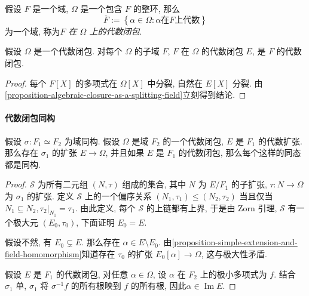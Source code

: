 \begin{proposition}
  假设 \( F \) 是一个域, \( \Omega \) 是一个包含 \( F \) 的整环, 那么
  \[
    \overline{F} := \left\lbrace \alpha \in \Omega: \alpha \text{在} F
    \text{上代数} \right\rbrace
  \]
  为一个域, 称为\emph{\( F \) 在 \( \Omega \) 上的代数闭包}.
\end{proposition}

\begin{corollary}
  假设 \( \Omega \) 是一个代数闭包.
  对每个 \( \Omega \) 的子域 \( F \), \( F \) 在 \( \Omega \) 的代数闭包 \( E
  \), 是 \( F \) 的代数闭包.
\end{corollary}
\begin{proof}
  每个 \( F[X] \) 的多项式在 \( \Omega[X] \) 中分裂, 自然在 \( E[X] \) 分裂.
  由\cref{proposition-algebraic-closure-as-a-splitting-field}立刻得到结论.
\end{proof}

\paragraph{代数闭包同构}

\begin{theorem}
  \label{theorem-algebraic-closure-isomorphic}
  假设 \( \sigma: F_1 \simeq F_2 \) 为域同构.
  假设 \( \Omega \) 是域 \( F_2 \) 的一个代数闭包, \( E \) 是 \( F_1 \)
  的代数扩张. 那么存在 \( \sigma_1 \) 的扩张 \( E \to \Omega \), 并且如果 \( E
  \) 是 \( F_1 \) 的代数闭包, 那么每个这样的同态都是同构.
\end{theorem}
\begin{proof}
  \( \mathcal{S} \) 为所有二元组 \( (N, \tau) \) 组成的集合, 其中 \( N \) 为 \(
  E/F_1 \) 的子扩张, \( \tau: N \to \Omega \) 为 \( \sigma_1 \) 的扩张.
  定义 \( \mathcal{S} \) 上的一个偏序关系 \( (N_1, \tau_1) \leq (N_2, \tau_2) \)
  当且仅当 \( N_1 \subseteq N_2, \left. \tau_2 \right\vert_{N_1} = \tau_1 \).
  由此定义, 每个 \( \mathcal{S} \) 的上链都有上界, 于是由 Zorn 引理, \(
  \mathcal{S} \) 有一个极大元 \( (E_0, \tau_0) \), 下面证明 \( E_0 = E \).

  假设不然, 有 \( E_0 \subsetneq E \).
  那么存在 \( \alpha \in E \setminus E_0 \).
  由\cref{proposition-simple-extension-and-field-homomorphism}知道存在 \( \tau_0
  \) 的扩张 \( E_0[\alpha] \to \Omega \), 这与极大性矛盾.

  假设 \( E \) 是 \( F_1 \) 的代数闭包, 对任意 \( \alpha \in \Omega \), 设 \(
  \alpha \) 在 \( F_2 \) 上的极小多项式为 \( f \).
  结合 \( \sigma_1 \) 单, \( \sigma_1 \) 将 \( \sigma^{-1}f \) 的所有根映到 \( f
  \) 的所有根, 因此\( \alpha \in \operatorname{Im} E \).
\end{proof}



